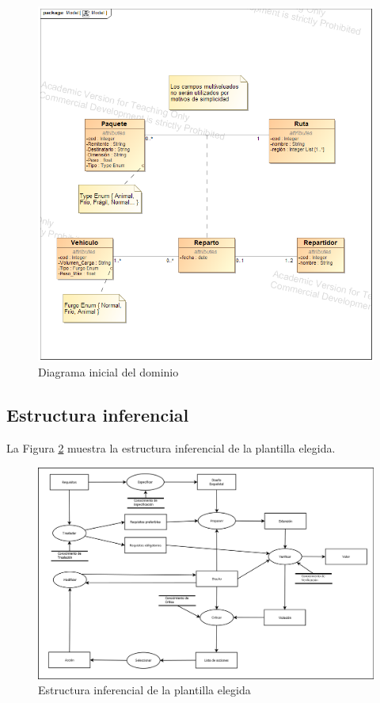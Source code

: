 \begin{figure}[H]
  \centering
  \includegraphics[scale=0.50]{imaxes/DiagramaInicialDominio.png}
  \caption{\label{fig:DiagramaInicialDominio}Diagrama inicial del dominio}
\end{figure}

\subsection{Estructura inferencial}

La Figura \ref{fig:EstructuraInferencial} muestra la estructura inferencial de la plantilla elegida.
\begin{figure}[H]
  \centering
  \includegraphics[scale=0.30]{imaxes/EstructuraInferencial.png}
  \caption{\label{fig:EstructuraInferencial}Estructura inferencial de la plantilla elegida}
\end{figure}

